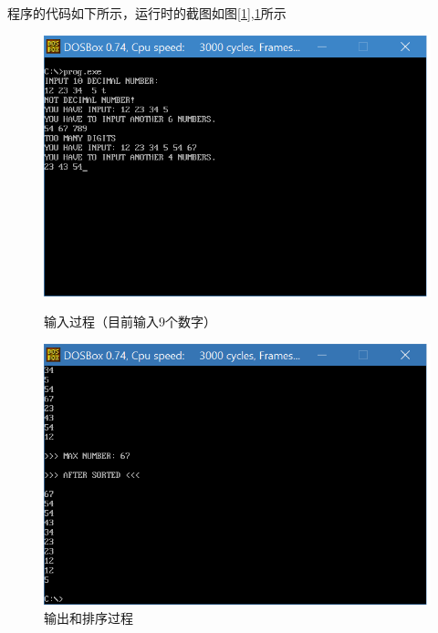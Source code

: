 \documentclass[UTF8,a4paper]{ctexart}
\begin{document}
程序的代码如下所示，运行时的截图如图\ref{1},\ref{2}所示\\



\begin{figure}
\centering
\includegraphics[width=\textwidth]{1.png}
\caption{输入过程（目前输入9个数字）}
\label{1}
\includegraphics[width=\textwidth]{2.png}
\caption{输出和排序过程}
\label{2}
\end{figure}
\end{document}
